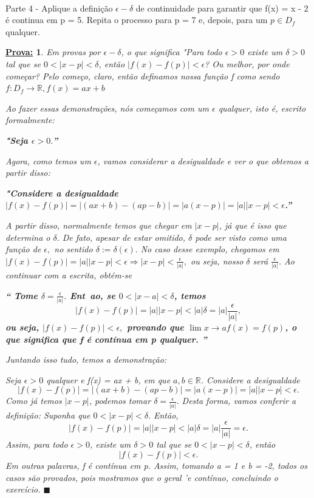 \documentclass{article}
\newtheorem*{proof*}{\underline{Prova:}}
\renewcommand\qedsymbol{$\blacksquare$}
\begin{document}
\paragraph{} Parte 4 - Aplique a defini\c c\~ao $\epsilon-\delta$ de continuidade para garantir que f(x) = x - 2 \'e continua em p = 5. Repita o processo para p = 7 e, depois, para um $p\in{D_f}$ qualquer.
\begin{proof*}
	Em provas por $\epsilon-\delta$, o que significa "Para todo $\epsilon > 0$ existe um $\delta > 0$ tal que se $0 < |x - p| < \delta$, ent\~ao $|f(x) - f(p)| < \epsilon$? Ou melhor, por onde come\c car? Pelo come\c co, claro, ent\~ao definamos nossa fun\c c\~ao f como sendo $f:D_f\rightarrow\mathbb{R}, f(x) = ax + b$

	Ao fazer essas demonstra\c c\~oes, n\'os come\c camos com um $\epsilon$ qualquer, isto \'e, escrito formalmente:

	\textbf{"Seja $\epsilon > 0.$''}

	Agora, como temos um $\epsilon$, vamos considerar a desigualdade e ver o que obtemos a partir disso:

	\textbf{"Considere a desigualdade $|f(x) - f(p)| = |(ax + b) - (ap - b)| = |a(x - p)| = |a||x - p|< \epsilon$.'' }

	A partir disso, normalmente temos que chegar em $|x - p|$, j\'a que \'e isso que determina o $\delta.$ De fato, apesar de estar omitido, $\delta$ pode ser visto como uma fun\c c\~ao de $\epsilon,$ no sentido $\delta := \delta(\epsilon).$
	No caso desse exemplo, chegamos em $|f(x) - f(p)| = |a||x - p| < \epsilon \Rightarrow |x - p| < \frac{\epsilon}{|a|},$ ou seja, nosso $\delta$ ser\'a $\frac{\epsilon}{|a|}$. Ao continuar com a escrita, obt\'em-se

	\textbf{``
		Tome $\delta = \frac{\epsilon}{|a|}.$ Ent~ao, se $0 < |x - a| < \delta$, temos
		$$
			|f(x) - f(p)| = |a||x - p| < |a|\delta = |a|\frac{\epsilon}{|a|},
		$$
		ou seja, $|f(x) - f(p)| < \epsilon,$ provando que $\lim{x\to{a}} f(x) = f(p)$, o que significa que f \'e cont\'inua em p qualquer.
		''}

	Juntando isso tudo, temos a demonstra\c c\~ao:

	Seja $\epsilon > 0$ qualquer e f(x) = ax + b, em que $a, b\in\mathbb{R}$. Considere a desigualdade
	$$
		|f(x) - f(p)| = |(ax + b) - (ap - b)| = |a(x - p)| = |a||x - p|< \epsilon.
	$$
	Como j\'a temos $|x - p|$, podemos tomar $\delta = \frac{\epsilon}{|a|}.$ Desta forma, vamos conferir a defini\c c\~ao: Suponha que $0 < |x - p| < \delta.$ Ent\~ao,
	$$
		|f(x) - f(p)| = |a||x - p| < |a|\delta = |a|\frac{\epsilon}{|a|} = \epsilon.
	$$
	Assim, para todo $\epsilon > 0$, existe um $\delta > 0$ tal que se $0 < |x - p| < \delta$, ent\~ao
	$$
		|f(x) - f(p)| < \epsilon.
	$$
	Em outras palavras, f \'e cont\'inua em p. Assim, tomando a = 1 e b = -2, todos os casos s\~ao provados, pois mostramos que o geral 'e cont\'inuo, concluindo o exerc\'icio.
	\qedsymbol
\end{proof*}
\end{document}
